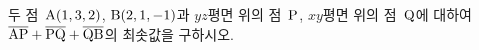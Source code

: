 두 점~$\mathrm{A}(1{,}\mkern3mu\mathopen{}3{,}\mkern3mu\mathopen{}2)$, $\mathrm{B}(2{,}\mkern3mu\mathopen{}1{,}\mkern3mu\mathopen{}-1)$과 $yz$평면 위의 점~$\mathrm{P}$, $xy$평면 위의 점~$\mathrm{Q}$에 대하여 $\overline{\mathrm{AP}}+\overline{\mathrm{PQ}}+\overline{\mathrm{QB}}$의 최솟값을 구하시오.
